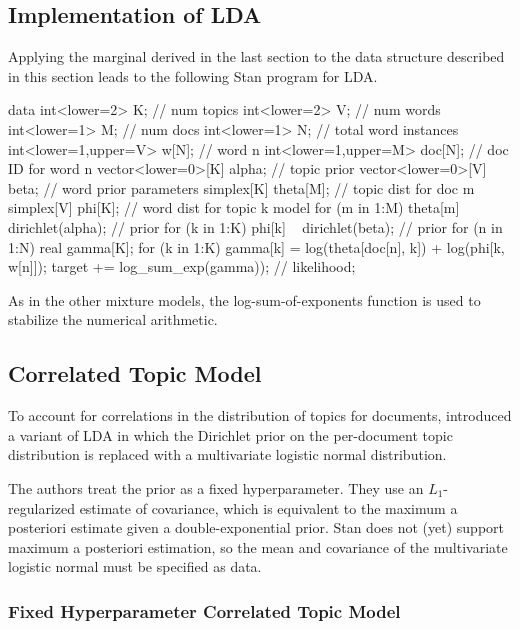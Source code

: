 \subsection{Implementation of LDA}


Applying the marginal derived in the last section to the data
structure described in this section leads to the following Stan
program for LDA.
%
\begin{stancode}
data {
  int<lower=2> K;               // num topics
  int<lower=2> V;               // num words
  int<lower=1> M;               // num docs
  int<lower=1> N;               // total word instances
  int<lower=1,upper=V> w[N];    // word n
  int<lower=1,upper=M> doc[N];  // doc ID for word n
  vector<lower=0>[K] alpha;     // topic prior
  vector<lower=0>[V] beta;      // word prior
}
parameters {
  simplex[K] theta[M];   // topic dist for doc m
  simplex[V] phi[K];     // word dist for topic k
}
model {
  for (m in 1:M)  
    theta[m] ~ dirichlet(alpha);  // prior
  for (k in 1:K)  
    phi[k] ~ dirichlet(beta);     // prior
  for (n in 1:N) {
    real gamma[K];
    for (k in 1:K) 
      gamma[k] = log(theta[doc[n], k]) + log(phi[k, w[n]]);
    target += log_sum_exp(gamma));  // likelihood;
  }
}
\end{stancode}
%
As in the other mixture models, the log-sum-of-exponents function is
used to stabilize the numerical arithmetic. 

\subsection{Correlated Topic Model}

To account for correlations in the distribution of topics for
documents, \citep{BleiLafferty:2007} introduced a variant of LDA in
which the Dirichlet prior on the per-document topic distribution is
replaced with a multivariate logistic normal distribution.  

The authors treat the prior as a fixed hyperparameter.  They use an
$L_1$-regularized estimate of covariance, which is equivalent to the
maximum a posteriori estimate given a double-exponential prior.  Stan
does not (yet) support maximum a posteriori estimation, so the mean and
covariance of the multivariate logistic normal must be specified as
data.

\subsubsection{Fixed Hyperparameter Correlated Topic Model}


